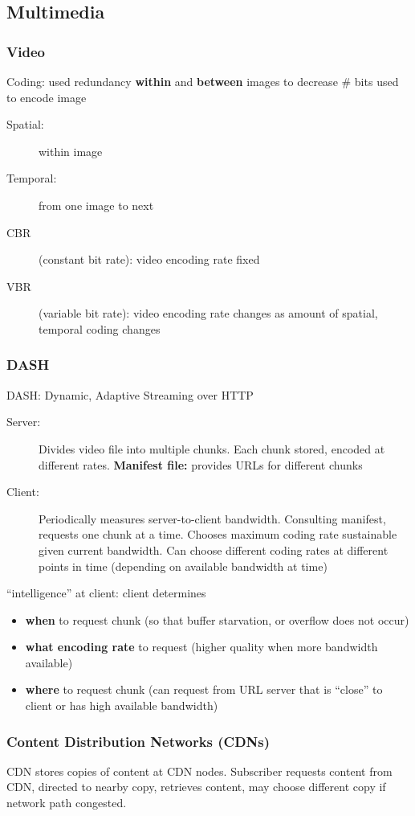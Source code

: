 \subsection{Multimedia}
\subsubsection{Video}
Coding: used redundancy \textbf{within} and \textbf{between} images to decrease \# bits used to encode image
\begin{description}
	\item[Spatial:] within image
	\item[Temporal:] from one image to next
	\item[CBR] (constant bit rate): video encoding rate fixed
	\item[VBR] (variable bit rate): video encoding rate changes as amount of spatial, temporal coding changes
\end{description}
\subsubsection{DASH}
DASH: Dynamic, Adaptive Streaming over HTTP
\begin{description}
	\item[Server:] Divides video file into multiple chunks. Each chunk stored, encoded at different rates. \textbf{Manifest file:} provides URLs for different chunks
	\item[Client:] Periodically measures server-to-client bandwidth. Consulting manifest, requests one chunk at a time. Chooses maximum coding rate sustainable given current bandwidth. Can choose different coding rates at different points in time (depending on available bandwidth at time)
\end{description}
``intelligence'' at client: client determines
\begin{itemize}
	\item \textbf{when} to request chunk (so that buffer starvation, or overflow does not occur)
	\item \textbf{what encoding rate} to request (higher quality when more bandwidth available)
	\item \textbf{where} to request chunk (can request from URL server that is ``close'' to client or has high available bandwidth)
\end{itemize}
\subsubsection{Content Distribution Networks (CDNs)}
CDN stores copies of content at CDN nodes. Subscriber requests content from CDN, directed to nearby copy, retrieves content, may choose different copy if network path congested.
